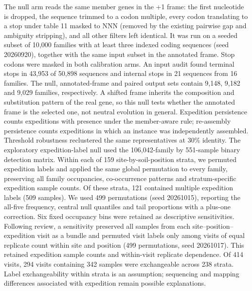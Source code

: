 \documentclass[11pt]{article}
\begin{document}
The null arm reads the same member genes in the +1 frame: the first nucleotide is dropped, the
sequence trimmed to a codon multiple, every codon translating to a stop under table 11 masked to NNN
(removed by the existing pairwise gap and ambiguity stripping), and all other filters left identical.
It was run on a seeded subset of 10{,}000 families with at least three indexed coding
sequences (seed 20260920), together with the same input subset in the annotated frame. Stop
codons were masked in both calibration arms. An input audit found terminal stops in 43{,}953 of
50{,}898 sequences and internal stops in 21 sequences from 16 families. The null, annotated-frame and paired output sets
contain 9{,}148, 9{,}182 and 9{,}029 families, respectively. A shifted frame inherits the composition and
substitution pattern of the real gene, so this null tests whether the annotated frame is the selected
one, not neutral evolution in general. Expedition persistence counts
expeditions with presence under the member-aware rule; re-assembly persistence counts expeditions in
which an instance was independently assembled. Threshold robustness reclustered the same
representatives at 30\% identity.
The exploratory expedition-label null used the 106{,}042-family by 551-sample binary detection matrix. Within each of 159 site-by-soil-position strata, we permuted expedition labels and applied the same global permutation to every family, preserving all family occupancies, co-occurrence patterns and stratum-specific expedition sample counts. Of these strata, 121 contained multiple expedition labels (509 samples). We used 499 permutations (seed 20261015), reporting the all-five frequency, central null quantiles and tail proportions with a plus-one correction. Six fixed occupancy bins were retained as descriptive sensitivities. Following review, a sensitivity preserved all samples from each site--position--expedition visit as a bundle and permuted visit labels only among visits of equal replicate count within site and position (499 permutations, seed 20261017). This retained expedition sample counts and within-visit replicate dependence. Of 414 visits, 294 visits containing 342 samples were exchangeable across 238 strata. Label exchangeability within strata is an assumption; sequencing and mapping differences associated with expedition remain possible explanations.
\end{document}
